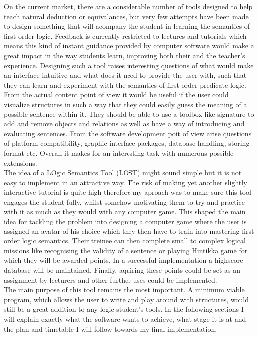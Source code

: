 \documentclass{article}
\begin{document}
\noindent On the current market, there are a considerable number of tools designed to help teach natural deduction or equivalances, but very few attempts have been made to design something that will acompany the student in learning the semantics of first order logic. Feedback is currently restricted to lectures and tutorials which means this kind of instant guidance provided by computer software would make a great impact in the way students learn, improving both their and the teacher's experience. Designing such a tool raises interesting questions of what would make an interface intuitive and what does it need to provide the user with, such that they can learn and experiment with the semantics of first order predicate logic. From the actual content point of view it would be useful if the user could visualize structures in such a way that they could easily guess the meaning of a possible sentence within it. They should be able to use a toolbox-like signature to add and remove objects and relations as well as have a way of introducing and evaluating sentences. From the software development poit of view arise questions of platform compatibility, graphic interface packages, database handling, storing format etc. Overall it makes for an interesting task with numerous possible extensions.\\

\noindent The idea of a LOgic Semantics Tool (LOST) might sound simple but it is not easy to implement in an attractive way. The risk of making yet another slightly interactive tutorial is quite high therefore my aproach was to make sure this tool engages the student fully, whilst somehow motivating them to try and practice with it as much as they would with any computer game. This shaped the main idea for tackling the problem into designing a computer game where the user is assigned an avatar of his choice which they then have to train into mastering first order logic semantics. Their treinee can then complete small to complex logical missions like recognising the validity of a sentence or playing Hintikka game for which they will be awarded points. In a successful implementation a highscore database will be maintained. Finally, aquiring these points could be set as an assignment by lecturers and other further uses could be implemented.\\

\noindent The main purpose of this tool remains the most important. A minimum viable program, which allows the user to write and play around with structures, would still be a great addition to any logic student's tools. In the following sections I will explain exactly what the software wants to achieve, what stage it is at and the plan and timetable I will follow towards my final implementation.
\end{document}
